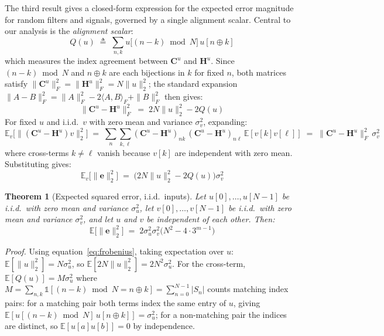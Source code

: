 \documentclass[10pt,a4paper]{amsart}
\newtheorem{theorem}{Theorem}
\begin{document}
The third result gives a closed-form expression for the expected error magnitude for random filters and signals, governed by a single alignment scalar. Central to our analysis is the \emph{alignment scalar}:
\begin{equation}
    \label{eq:Q-def}
    Q(u) \;\triangleq\; \sum_{n,k} u\bigl[(n-k)\bmod N\bigr]\,u[n\oplus k]
\end{equation}
which measures the index agreement between $\mathbf{C}^u$ and $\mathbf{H}^u$. Since $(n-k)\bmod N$ and $n\oplus k$ are each bijections in $k$ for fixed $n$, both matrices satisfy $\|\mathbf{C}^u\|_F^2 = \|\mathbf{H}^u\|_F^2 = N\|u\|_2^2$; the standard expansion $\|A-B\|_F^2 = \|A\|_F^2 - 2\langle A,B\rangle_F + \|B\|_F^2$ then gives:
\begin{equation}
    \label{eq:frobenius}
    \|\mathbf{C}^u-\mathbf{H}^u\|_F^2 \;=\; 2N\|u\|_2^2 - 2Q(u)
\end{equation}
For fixed $u$ and i.i.d.\ $v$ with zero mean and variance $\sigma_v^2$, expanding:
\begin{equation}
    \label{eq:Av-expand}
    \mathbb{E}_v\bigl[\|(\mathbf{C}^u-\mathbf{H}^u)v\|_2^2\bigr] \;=\; \sum_{n}\sum_{k,\ell} (\mathbf{C}^u-\mathbf{H}^u)_{nk}\,(\mathbf{C}^u-\mathbf{H}^u)_{n\ell}\,\mathbb{E}[v[k]v[\ell]] \;=\; \|\mathbf{C}^u-\mathbf{H}^u\|_F^2\,\sigma_v^2
\end{equation}
where cross-terms $k\neq\ell$ vanish because $v[k]$ are independent with zero mean. Substituting gives:
\begin{equation}
    \label{eq:fixed-filter-error}
    \mathbb{E}_v\bigl[\|\mathbf{e}\|_2^2\bigr] \;=\; \bigl(2N\|u\|_2^2 - 2Q(u)\bigr)\sigma_v^2
\end{equation}

\medskip
\begin{theorem}[Expected squared error, i.i.d.\ inputs]\label{thm:expected-error}
Let $u[0],\ldots,u[N-1]$ be i.i.d.\ with zero mean and variance $\sigma_u^2$, let $v[0],\ldots,v[N-1]$ be i.i.d.\ with zero mean and variance $\sigma_v^2$, and let $u$ and $v$ be independent of each other. Then:
\begin{equation}
    \label{eq:expected-error}
    \mathbb{E}\bigl[\|\mathbf{e}\|_2^2\bigr] \;=\; 2\sigma_u^2\sigma_v^2\bigl(N^2 - 4\cdot 3^{m-1}\bigr)
\end{equation}
\end{theorem}

\noindent\textit{Proof.} Using equation~\eqref{eq:frobenius}, taking expectation over $u$: $\mathbb{E}[\|u\|_2^2] = N\sigma_u^2$, so $\mathbb{E}[2N\|u\|_2^2] = 2N^2\sigma_u^2$. For the cross-term, $\mathbb{E}[Q(u)] = M\sigma_u^2$ where $M = \sum_{n,k}\mathbb{1}[(n-k)\bmod N = n\oplus k] = \sum_{n=0}^{N-1}|S_n|$ counts matching index pairs: for a matching pair both terms index the same entry of $u$, giving $\mathbb{E}[u[(n-k)\bmod N]\,u[n\oplus k]] = \sigma_u^2$; for a non-matching pair the indices are distinct, so $\mathbb{E}[u[a]u[b]] = 0$ by independence.
\end{document}
